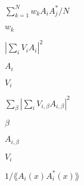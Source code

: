 \documentclass{article}
\begin{document}
$ \sum_{k=1}^{N} w_k A_i A_j^* / N $
\pagebreak

$ w_k $
\pagebreak

$ \left| \sum_i V_i A_i \right|^2 $
\pagebreak

$ A_i $
\pagebreak

$ V_i $
\pagebreak

$ \sum_\beta \left| \sum_i V_{i,\beta} A_{i,\beta} \right|^2 $
\pagebreak

$ \beta $
\pagebreak

$ A_{i,\beta} $
\pagebreak

$ V_i$
\pagebreak

$ 1 / \lang A_i(x) A_i^*(x) \rang $
\pagebreak
\end{document}
